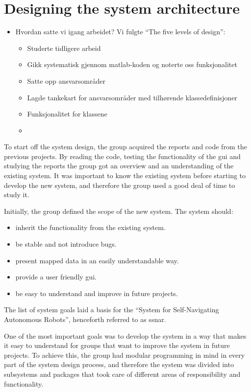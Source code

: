 \section{Designing the system architecture}
\begin{itemize}
	\item Hvordan satte vi igang arbeidet? Vi fulgte ``The five levels of design'':
	\begin{itemize}
		\item Studerte tidligere arbeid
		\item Gikk systematisk gjennom matlab-koden og noterte oss funksjonalitet
		\item Satte opp ansvarsområder
		\item Lagde tankekart for ansvarsområder med tilhørende klassedefinisjoner
		\item Funksjonalitet for klassene
		\item 
	\end{itemize} 
\end{itemize}

To start off the system design, the group acquired the reports and code from the previous projects. By reading the code, testing the functionality of the \acrshort{gui} and studying the reports the group got an overview and an understanding of the existing system. It was important to know the existing system before starting to develop the new system, and therefore the group used a good deal of time to study it.

Initially, the group defined the scope of the new system. The system should:
\begin{itemize}
	\item inherit the functionality from the existing system.
	\item be stable and not introduce bugs.
	\item present mapped data in an easily understandable way.
	\item provide a user friendly \acrshort{gui}.
	\item be easy to understand and improve in future projects.
\end{itemize}
The list of system goals laid a basis for the ``System for Self-Navigating Autonomous Robots'', henceforth referred to as \acrshort{ssnar}.

One of the most important goals was to develop the system in a way that makes it easy to understand for groups that want to improve the system in future projects. To achieve this, the group had modular programming in mind in every part of the system design process, and therefore the system was divided into subsystems and packages that took care of different areas of responsibility and functionality.
